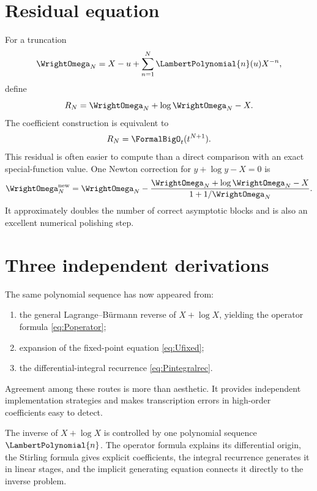 \documentclass[11pt,oneside,openany]{book}
\begin{document}
\section{Residual equation}
For a truncation
\[
 \WrightOmega_N=X-u+\sum_{n=1}^{N}\LambertPolynomial{n}(u)X^{-n},
\]
define
\begin{equation}\label{eq:omegaresidual}
 R_N=\WrightOmega_N+\log\WrightOmega_N-X.
\end{equation}
The coefficient construction is equivalent to
\begin{equation}\label{eq:omegaresidualorder}
 R_N=\FormalBigO_t(t^{N+1}).
\end{equation}
This residual is often easier to compute than a direct comparison with an
exact special-function value.  One Newton correction for
\(y+\log y-X=0\) is
\begin{equation}\label{eq:omeganewtonpolish}
 \WrightOmega_N^{\mathrm{new}}
 =\WrightOmega_N-
 \frac{\WrightOmega_N+\log\WrightOmega_N-X}
      {1+1/\WrightOmega_N}.
\end{equation}
It approximately doubles the number of correct asymptotic blocks and is also
an excellent numerical polishing step.

\section{Three independent derivations}
The same polynomial sequence has now appeared from:
\begin{enumerate}
\item the general Lagrange--Bürmann reverse of \(X+\log X\), yielding the
operator formula \cref{eq:Poperator};
\item expansion of the fixed-point equation \cref{eq:Ufixed};
\item the differential-integral recurrence \cref{eq:Pintegralrec}.
\end{enumerate}
Agreement among these routes is more than aesthetic.  It provides independent
implementation strategies and makes transcription errors in high-order
coefficients easy to detect.

\begin{summarybox}
The inverse of \(X+\log X\) is controlled by one polynomial sequence
\(\LambertPolynomial{n}\).  The operator formula explains its differential origin, the Stirling
formula gives explicit coefficients, the integral recurrence generates it in
linear stages, and the implicit generating equation connects it directly to
the inverse problem.
\end{summarybox}
\end{document}
